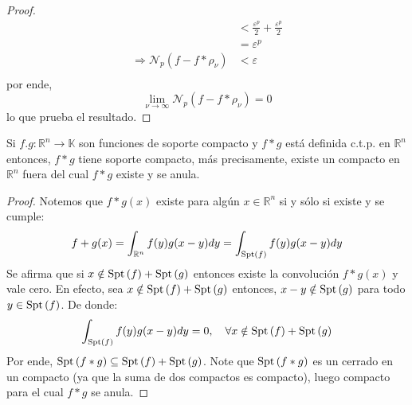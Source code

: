 \documentclass[12pt]{report}
\theoremstyle{largebreak}
\newcommand\cf[3]{\ensuremath{#1:#2\rightarrow#3}}
\newcommand{\N}[2]{\ensuremath{\mathcal{N}_{#1}\left(#2\right)}}
\newcommand{\Spt}[1]{\ensuremath{\textup{Spt}\left(#1\right)}}
\begin{document}
\begin{proof}
\begin{equation*}
\begin{split}
                &<\frac{\varepsilon^p}{2}+\frac{\varepsilon^p}{2}\\
                &=\varepsilon^p\\
                \Rightarrow \N{p}{f-f*\rho_\nu}&<\varepsilon\\
            \end{split}
        \end{equation*}
        por ende,
        \begin{equation*}
            \lim_{\nu\rightarrow\infty}\N{p}{f-f*\rho_\nu}=0
        \end{equation*}
        lo que prueba el resultado.
    \end{proof}

    \begin{lema}
        Si $\cf{f.g}{\mathbb{R}^n}{\mathbb{K}}$ son funciones de soporte compacto y $f*g$ está definida c.t.p. en $\mathbb{R}^n$ entonces, $f*g$ tiene soporte compacto, más precisamente, existe un compacto en $\mathbb{R}^n$ fuera del cual $f*g$ existe y se anula. 
    \end{lema}

    \begin{proof}
        Notemos que $f*g(x)$ existe para algún $x\in\mathbb{R}^n$ si y sólo si existe y se cumple:
        \begin{equation*}
            f+g(x)=\int_{\mathbb{R}^n}f(y)g(x-y)dy=\int_{\Spt{f}}f(y)g(x-y)dy
        \end{equation*}
        Se afirma que si $x\notin\Spt{f}+\Spt{g}$ entonces existe la convolución $f*g(x)$ y vale cero. En efecto, sea $x\notin \Spt{f}+\Spt{g}$ entonces, $x-y\notin\Spt{g}$ para todo $y\in\Spt{f}$. De donde:
        \begin{equation*}
            \int_{\Spt{f}}f(y)g(x-y)dy=0,\quad\forall x\notin\Spt{f}+\Spt{g}
        \end{equation*}
        Por ende, $\Spt{f*g}\subseteq\Spt{f}+\Spt{g}$. Note que $\Spt{f*g}$ es un cerrado en un compacto (ya que la suma de dos compactos es compacto), luego compacto para el cual $f*g$ se anula.
    \end{proof}
\end{document}
